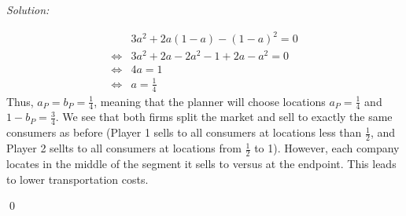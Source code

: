 \documentclass[12pt]{article}
\newenvironment{problem}[2][Problem]{\begin{trivlist}
\item[\hskip \labelsep {\bfseries #1}\hskip \labelsep {\bfseries #2.}]}{\end{trivlist}}
\newenvironment{sol}
    {\emph{Solution:}
    }
    {
    \qed
    }
\begin{document}
\begin{sol}
\begin{enumerate}[label=\alph*) ]
        \begin{align*}&3 a^2 + 2 a(1-a) - (1-a)^2 = 0 \\
            \iff& 3a^2 + 2a -2a^2 - 1 + 2a - a^2 = 0\\
            \iff&  4a = 1 \\
            \iff& a = \frac{1}{4}\end{align*}
        Thus, $a_P = b_P = \frac{1}{4}$, meaning that the planner will choose locations $a_P = \frac{1}{4}$ and $1-b_P = \frac{3}{4}$. We see that both firms split the market and sell to exactly the same consumers as before (Player 1 sells to all consumers at locations less than $\frac{1}{2}$, and Player 2 sellts to all consumers at locations from $\frac{1}{2} $ to 1). However, each company locates in the middle of the segment it sells to versus at the endpoint. This leads to lower transportation costs.
        \end{enumerate}
\end{sol}
\begin{problem}{3}
\end{problem}
\end{document}
